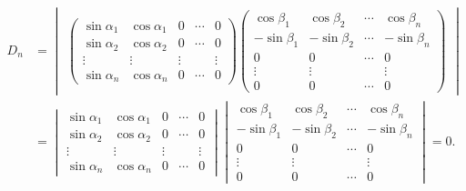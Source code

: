 \documentclass[../../main.tex]{subfiles}
\begin{document}
\begin{solution}
\[\begin{aligned}
D_n &= \begin{vmatrix} \begin{pmatrix} \sin \alpha_1 & \cos \alpha_1 & 0 & \cdots & 0 \\ \sin \alpha_2 & \cos \alpha_2 & 0 & \cdots & 0 \\ \vdots & \vdots & \vdots & & \vdots \\ \sin \alpha_n & \cos \alpha_n & 0 & \cdots & 0 \end{pmatrix} \begin{pmatrix} \cos \beta_1 & \cos \beta_2 & \cdots & \cos \beta_n \\ -\sin \beta_1 & -\sin \beta_2 & \cdots & -\sin \beta_n \\ 0 & 0 & \cdots & 0 \\ \vdots & \vdots & & \vdots \\ 0 & 0 & \cdots & 0 \end{pmatrix} \end{vmatrix} \\
&= \begin{vmatrix} \sin \alpha_1 & \cos \alpha_1 & 0 & \cdots & 0 \\ \sin \alpha_2 & \cos \alpha_2 & 0 & \cdots & 0 \\ \vdots & \vdots & \vdots & & \vdots \\ \sin \alpha_n & \cos \alpha_n & 0 & \cdots & 0 \end{vmatrix} \begin{vmatrix} \cos \beta_1 & \cos \beta_2 & \cdots & \cos \beta_n \\ -\sin \beta_1 & -\sin \beta_2 & \cdots & -\sin \beta_n \\ 0 & 0 & \cdots & 0 \\ \vdots & \vdots & & \vdots \\ 0 & 0 & \cdots & 0 \end{vmatrix} = 0.
\end{aligned}
\]
\end{solution}
\end{document}
